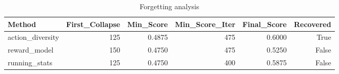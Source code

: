 \begin{table}[htbp]
\centering
\caption{Forgetting analysis}
\label{tab:forgetting}
\begin{tabular}{lrrrrr}
\toprule
\textbf{Method} & \textbf{First\_Collapse} & \textbf{Min\_Score} & \textbf{Min\_Score\_Iter} & \textbf{Final\_Score} & \textbf{Recovered} \\
\midrule
action\_diversity & 125 & 0.4875 & 475 & 0.6000 & True \\
reward\_model & 150 & 0.4750 & 475 & 0.5250 & False \\
running\_stats & 125 & 0.4750 & 400 & 0.5875 & False \\
\bottomrule
\end{tabular}
\end{table}